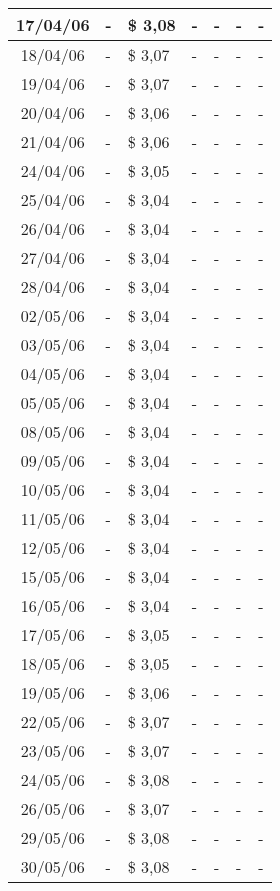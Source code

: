 \begin{center}
\begin{longtable}{|c|p{1.5cm}|p{1.5cm}|p{1.5cm}|p{1.5cm}|p{1.5cm}|p{1.5cm}|}
17/04/06 & - & \$ 3,08 & - & - & - & - \\ \hline
18/04/06 & - & \$ 3,07 & - & - & - & - \\ \hline
19/04/06 & - & \$ 3,07 & - & - & - & - \\ \hline
20/04/06 & - & \$ 3,06 & - & - & - & - \\ \hline
21/04/06 & - & \$ 3,06 & - & - & - & - \\ \hline
24/04/06 & - & \$ 3,05 & - & - & - & - \\ \hline
25/04/06 & - & \$ 3,04 & - & - & - & - \\ \hline
26/04/06 & - & \$ 3,04 & - & - & - & - \\ \hline
27/04/06 & - & \$ 3,04 & - & - & - & - \\ \hline
28/04/06 & - & \$ 3,04 & - & - & - & - \\ \hline
02/05/06 & - & \$ 3,04 & - & - & - & - \\ \hline
03/05/06 & - & \$ 3,04 & - & - & - & - \\ \hline
04/05/06 & - & \$ 3,04 & - & - & - & - \\ \hline
05/05/06 & - & \$ 3,04 & - & - & - & - \\ \hline
08/05/06 & - & \$ 3,04 & - & - & - & - \\ \hline
09/05/06 & - & \$ 3,04 & - & - & - & - \\ \hline
10/05/06 & - & \$ 3,04 & - & - & - & - \\ \hline
11/05/06 & - & \$ 3,04 & - & - & - & - \\ \hline
12/05/06 & - & \$ 3,04 & - & - & - & - \\ \hline
15/05/06 & - & \$ 3,04 & - & - & - & - \\ \hline
16/05/06 & - & \$ 3,04 & - & - & - & - \\ \hline
17/05/06 & - & \$ 3,05 & - & - & - & - \\ \hline
18/05/06 & - & \$ 3,05 & - & - & - & - \\ \hline
19/05/06 & - & \$ 3,06 & - & - & - & - \\ \hline
22/05/06 & - & \$ 3,07 & - & - & - & - \\ \hline
23/05/06 & - & \$ 3,07 & - & - & - & - \\ \hline
24/05/06 & - & \$ 3,08 & - & - & - & - \\ \hline
26/05/06 & - & \$ 3,07 & - & - & - & - \\ \hline
29/05/06 & - & \$ 3,08 & - & - & - & - \\ \hline
30/05/06 & - & \$ 3,08 & - & - & - & - \\ \hline

\end{longtable}
\end{center}
